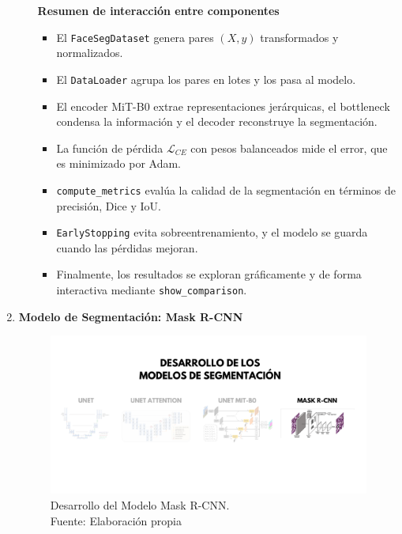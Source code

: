 \begin{enumerate}
\begin{itemize}
\textbf{Resumen de interacción entre componentes}
\begin{itemize}
  \item El \texttt{FaceSegDataset} genera pares \((X, y)\) transformados y normalizados.
  \item El \texttt{DataLoader} agrupa los pares en lotes y los pasa al modelo.
  \item El encoder MiT-B0 extrae representaciones jerárquicas, el bottleneck condensa la información y el decoder reconstruye la segmentación.
  \item La función de pérdida \(\mathcal{L}_{CE}\) con pesos balanceados mide el error, que es minimizado por Adam.
  \item \texttt{compute\_metrics} evalúa la calidad de la segmentación en términos de precisión, Dice y IoU.
  \item \texttt{EarlyStopping} evita sobreentrenamiento, y el modelo se guarda cuando las pérdidas mejoran.
  \item Finalmente, los resultados se exploran gráficamente y de forma interactiva mediante \texttt{show\_comparison}.
\end{itemize}

  \end{itemize}

  \newpage
  \item \textbf{Modelo de Segmentación: Mask R-CNN}
  \begin{figure}[H]
	\begin{center}
		\includegraphics[width=1\textwidth]{4/figures/desmask.png}
		\caption[Desarrollo del Modelo Mask R-CNN]{Desarrollo del Modelo Mask R-CNN.\\
		Fuente: Elaboración propia}
		\label{4:figdesmask}
	\end{center}
\end{figure}
  \begin{itemize}


\end{itemize}
\end{enumerate}
